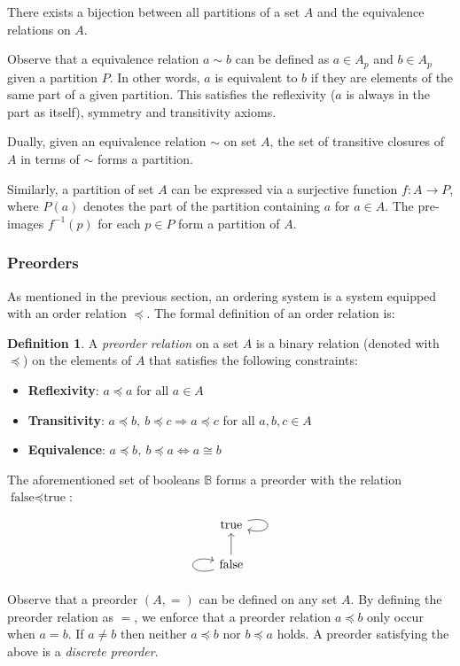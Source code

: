 \documentclass[12pt]{article}
\theoremstyle{definition}
\newtheorem{defn}{Definition}[section]
\newcommand{\T}{\text{true}}
\newcommand{\F}{\text{false}}
\begin{document}
	There exists a bijection between all partitions of a set $A$ and the equivalence relations on $A$.
	
	Observe that a equivalence relation $a \sim b$ can be defined as $a \in A_p$ and $b \in A_p$ given a partition $P$. In other words, $a$ is equivalent to $b$ if they are elements of the same part of a given partition. This satisfies the reflexivity ($a$ is always in the part as itself), symmetry and transitivity axioms.
	
	Dually, given an equivalence relation $\sim$ on set $A$, the set of transitive closures of $A$ in terms of $\sim$ forms a partition.
	
	Similarly, a partition of set $A$ can be expressed via a surjective function $f: A \to P$, where $P(a)$ denotes the part of the partition containing $a$ for $a \in A$. The pre-images $f^{-1}(p)$ for each $p \in P$ form a partition of $A$.
	
	\subsubsection{Preorders}
	
	As mentioned in the previous section, an ordering system is a system equipped with an order relation $\preceq$. The formal definition of an order relation is:
	\begin{defn}
		A \emph{preorder relation} on a set $A$ is a binary relation (denoted with $\preceq$) on the elements of $A$ that satisfies the following constraints:
		\begin{itemize}
			\item \textbf{Reflexivity}: $a \preceq a$ for all $a \in A$
			\item \textbf{Transitivity}: $a \preceq b,\ b \preceq c \Rightarrow a \preceq c$ for all $a, b, c \in A$
			\item \textbf{Equivalence}: $a \preceq b,\ b \preceq a \iff a \cong b$
		\end{itemize}
	\end{defn}
	
	The aforementioned set of booleans $\mathbb{B}$ forms a preorder with the relation $\F \preceq \T$:
	\begin{equation*}\begin{tikzcd}
		\T \ar[loop right] \\ \F \ar[u] \ar[loop left]
	\end{tikzcd}\end{equation*}
	
	Observe that a preorder $(A, =)$ can be defined on any set $A$. By defining the preorder relation as $=$, we enforce that a preorder relation $a \preceq b$ only occur when $a = b$. If $a \neq b$ then neither $a \preceq b$ nor $b \preceq a$ holds. A preorder satisfying the above is a \emph{discrete preorder}.
	
\end{document}
